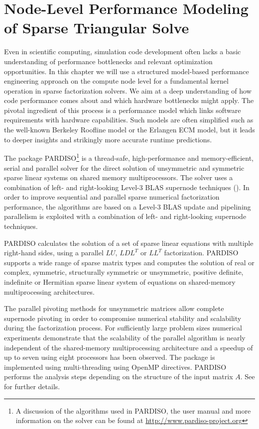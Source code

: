 \chapter{Node-Level Performance Modeling of Sparse Triangular Solve}
\label{c:modeling}

Even in scientific computing, simulation code development often lacks a basic understanding of performance bottlenecks and relevant optimization opportunities. In this chapter we will use a structured model-based performance engineering approach on the compute node level for a fundamental kernel operation in sparse factorization solvers. We aim at a deep understanding of how code performance comes about and which hardware bottlenecks might apply. The pivotal ingredient of this process is a performance model which links software requirements with hardware capabilities. Such models are often simplified such as the well-known Berkeley Roofline model or the Erlangen ECM model, but it leads to deeper insights and strikingly more accurate runtime predictions.

The package PARDISO\footnote{A discussion of the algorithms used in
PARDISO, the user manual and more information on the solver can be found at
\url{http://www.pardiso-project.org}}
is a thread-safe, high-performance and memory-effi\-cient,
serial and parallel solver for the direct solution of unsymmetric
and symmetric sparse linear systems on shared memory multiprocessors.
The solver uses a combination
of left- and right-looking Level-3 BLAS supernode techniques
(\cite{AndBBDDDGHMOS99}).
In order to improve sequential and parallel sparse
numerical factorization performance, the algorithms are based on
a Level-3 BLAS update and pipelining parallelism is exploited with
a combination of left- and right-looking supernode techniques.

PARDISO calculates the solution of a set of sparse linear equations
with multiple right-hand sides, using a parallel $LU$, $LDL^T$ or $LL^T$
factorization. PARDISO supports a wide range of sparse matrix types and
computes the solution of real or complex,
symmetric, structurally symmetric or unsymmetric, positive definite,
indefinite or Hermitian sparse linear system of equations on shared-memory
multiprocessing architectures.

The parallel pivoting methods for unsymmetric matrices allow complete supernode pivoting in order to compromise numerical stability and scalability during the factorization process. For sufficiently large problem sizes numerical experiments demonstrate that the scalability of the parallel algorithm is nearly independent of the shared-memory multiprocessing architecture and a speedup of up to seven using eight processors has been observed. The package is implemented using multi-threading using OpenMP directives. PARDISO performs the analysis steps depending on the structure
of the input matrix $A$. See \cite{Bollhofer2020} for further details.

